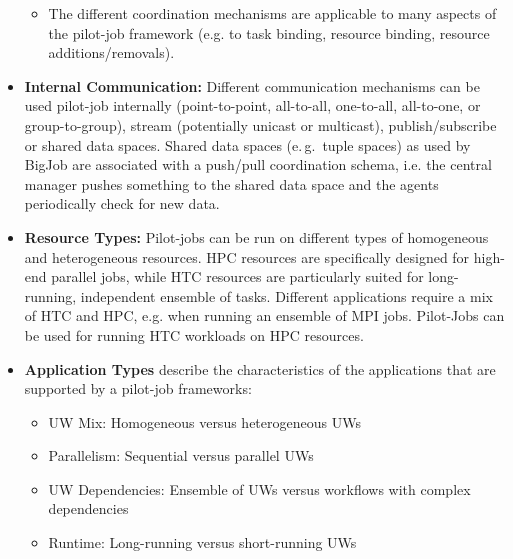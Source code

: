 \documentclass[conference,final]{IEEEtran}
\begin{document}
\begin{itemize}
\begin{itemize}
			\item The different coordination mechanisms are applicable to many 
			aspects of the pilot-job framework 
			(e.g. to task binding, resource binding, resource 
			additions/removals).    		
		\end{itemize}
		
\item \textbf{Internal Communication:} Different communication 
       	mechanisms can be used pilot-job  internally  (point-to-point, 
       	all-to-all, one-to-all, all-to-one, or group-to-group),
        stream (potentially unicast or multicast), publish/subscribe or      
        shared data spaces. Shared data spaces (e.\,g.\ tuple spaces) as used by 
        BigJob are associated with a push/pull coordination schema, i.e. the 
        central manager pushes something to the shared data space and the agents 
        periodically check for new data.
       	
		
\item \textbf{Resource Types:} Pilot-jobs can be run on different 
types of homogeneous and heterogeneous resources. HPC resources are specifically 
designed for high-end parallel jobs, while HTC resources are particularly suited 
for long-running, independent 
ensemble of tasks. Different applications require a mix of HTC and HPC, e.g. 
when running an ensemble of MPI jobs. Pilot-Jobs can be used for running HTC 
workloads on HPC resources. 

\item \textbf{Application Types} describe the characteristics of the 
applications that are supported by a pilot-job frameworks:
\begin{itemize}
    \item UW Mix: Homogeneous versus heterogeneous UWs
    \item Parallelism: Sequential versus parallel UWs
    \item UW Dependencies: Ensemble of UWs versus workflows with complex 
    dependencies
    \item Runtime: Long-running versus short-running UWs
\end{itemize}


\end{itemize}
\end{document}
